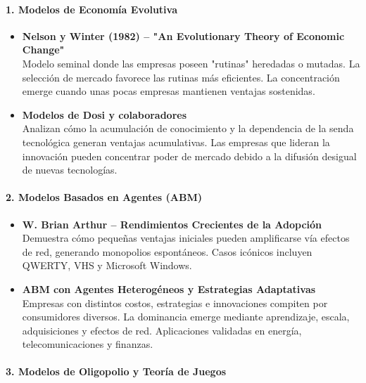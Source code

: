 \documentclass[a4paper,12pt]{article}
\begin{document}
\paragraph{1. Modelos de Economía Evolutiva}

\begin{itemize}
    \item \textbf{Nelson y Winter (1982) – "An Evolutionary Theory of Economic Change"}\\
    Modelo seminal donde las empresas poseen "rutinas" heredadas o mutadas. La selección de mercado favorece las rutinas más eficientes. La concentración emerge cuando unas pocas empresas mantienen ventajas sostenidas.

    \item \textbf{Modelos de Dosi y colaboradores}\\
    Analizan cómo la acumulación de conocimiento y la dependencia de la senda tecnológica generan ventajas acumulativas. Las empresas que lideran la innovación pueden concentrar poder de mercado debido a la difusión desigual de nuevas tecnologías.
\end{itemize}

\paragraph{2. Modelos Basados en Agentes (ABM)}

\begin{itemize}
    \item \textbf{W. Brian Arthur – Rendimientos Crecientes de la Adopción}\\
    Demuestra cómo pequeñas ventajas iniciales pueden amplificarse vía efectos de red, generando monopolios espontáneos. Casos icónicos incluyen QWERTY, VHS y Microsoft Windows.

    \item \textbf{ABM con Agentes Heterogéneos y Estrategias Adaptativas}\\
    Empresas con distintos costos, estrategias e innovaciones compiten por consumidores diversos. La dominancia emerge mediante aprendizaje, escala, adquisiciones y efectos de red. Aplicaciones validadas en energía, telecomunicaciones y finanzas.
\end{itemize}

\paragraph{3. Modelos de Oligopolio y Teoría de Juegos}
\end{document}
